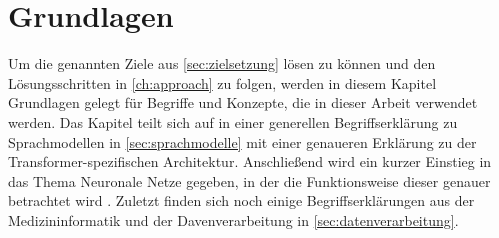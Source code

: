 \chapter{Grundlagen}\label{ch:preliminaries}








Um die genannten Ziele aus \cref{sec:zielsetzung} lösen zu können und den Lösungsschritten in \cref{ch:approach} zu folgen, werden in diesem Kapitel Grundlagen gelegt für Begriffe und Konzepte, die in dieser Arbeit verwendet werden.
Das Kapitel teilt sich auf in einer generellen Begriffserklärung zu Sprachmodellen in \cref{sec:sprachmodelle} mit einer genaueren Erklärung zu der Transformer-spezifischen Architektur.
Anschließend wird ein kurzer Einstieg in das Thema Neuronale Netze gegeben, in der die Funktionsweise dieser genauer betrachtet wird .
Zuletzt finden sich noch einige Begriffserklärungen aus der Medizininformatik und der Davenverarbeitung in \cref{sec:datenverarbeitung}.

